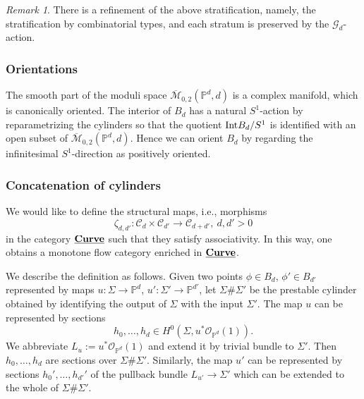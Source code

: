 \documentclass[reqno, 10pt]{amsart}
\numberwithin{equation}{section}
\numberwithin{equation}{section}
\theoremstyle{definition}
\theoremstyle{remark}
\newtheorem{rem}[thm]{Remark}
\newcommand{\beqn}{\begin{equation*}}
\newcommand{\eeqn}{\end{equation*}}
\newcommand{\ov}{\overline}
\newcommand{\mb}{\mathbb}
\newcommand{\mc}{\mathcal}
\newcommand{\uds}[1]{\underline{\smash{#1}}}
\begin{document}
\begin{rem}
There is a refinement of the above stratification, namely, the stratification by combinatorial types, and each stratum is preserved by the ${\mc G}_d$-action. 
\end{rem}


\subsubsection{Orientations}

The smooth part of the moduli space $\ov{\mc M}_{0,2}({\mb P}^d, d)$ is a complex manifold, which is canonically oriented. The interior of $B_d$ has a natural $S^1$-action by reparametrizing the cylinders so that the quotient ${\rm Int} B_d/S^1$ is identified with an open subset of $\ov{\mc M}_{0,2}({\mb P}^d, d)$. Hence we can orient $B_d$ by regarding the infinitesimal $S^1$-direction as positively oriented. 










\subsubsection{Concatenation of cylinders}

We would like to define the structural maps, i.e., morphisms 
\beqn
\zeta_{d, d'}: {\mc C}_{d} \times {\mc C}_{d'} \to {\mc C}_{d + d'},\ d, d' > 0
\eeqn
in the category $\uds{\bf Curve}$ such that they satisfy associativity. In this way, one obtains a monotone flow category enriched in $\uds{\bf Curve}$. 

We describe the definition as follows. Given two points $\phi \in B_d$, $\phi' \in B_{d'}$ represented by maps $u: \Sigma \to {\mb P}^d$, $u': \Sigma' \to {\mb P}^{d'}$, let $\Sigma \# \Sigma'$ be the prestable cylinder obtained by identifying the output of $\Sigma$ with the input $\Sigma'$. The map $u$ can be represented by sections
\beqn
h_0, \ldots, h_d \in H^0(\Sigma, u^* {\mc O}_{{\mb P}^{d}}(1)).
\eeqn
We abbreviate $L_u:= u^* {\mc O}_{{\mb P}^d}(1)$ and extend it by trivial bundle to $\Sigma'$. Then $h_0, \ldots, h_d$ are sections over $\Sigma \# \Sigma'$. Similarly, the map $u'$ can be represented by sections $h_0', \ldots, h_{d'}'$ of the pullback bundle $L_{u'} \to \Sigma'$ which can be extended to the whole of $\Sigma \# \Sigma'$. 
\end{document}
